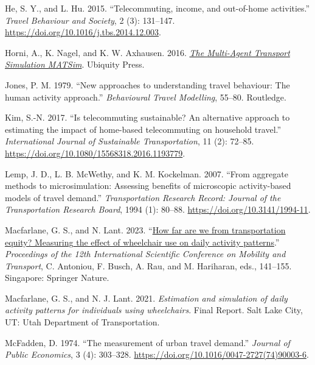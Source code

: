 \documentclass[fancy, twoside, mastersfancy, ms]{byuthesis}
\newlength{\cslhangindent}
\newenvironment{CSLReferences}[2] %
 {\begin{list}{}{%
  \setlength{\itemindent}{0pt}
  \setlength{\leftmargin}{0pt}
  \setlength{\parsep}{0pt}
  \ifodd #1
   \setlength{\leftmargin}{\cslhangindent}
   \setlength{\itemindent}{-1\cslhangindent}
  \fi
  \setlength{\itemsep}{#2\baselineskip}}}
 {\end{list}}
\begin{document}
\begin{CSLReferences}{1}{0}
He, S. Y., and L. Hu. 2015. {``Telecommuting, income, and out-of-home
activities.''} \emph{Travel Behaviour and Society}, 2 (3): 131--147.
\url{https://doi.org/10.1016/j.tbs.2014.12.003}.

Horni, A., K. Nagel, and K. W. Axhausen. 2016.
\emph{\href{https://doi.org/10.5334/baw}{The {Multi-Agent Transport
Simulation MATSim}}}. Ubiquity Press.

Jones, P. M. 1979. {``New approaches to understanding travel behaviour:
The human activity approach.''} \emph{Behavioural {Travel Modelling}},
55--80. Routledge.

Kim, S.-N. 2017. {``Is telecommuting sustainable? {An} alternative
approach to estimating the impact of home-based telecommuting on
household travel.''} \emph{International Journal of Sustainable
Transportation}, 11 (2): 72--85.
\url{https://doi.org/10.1080/15568318.2016.1193779}.

Lemp, J. D., L. B. McWethy, and K. M. Kockelman. 2007. {``From aggregate
methods to microsimulation: Assessing benefits of microscopic
activity-based models of travel demand.''} \emph{Transportation Research
Record: Journal of the Transportation Research Board}, 1994 (1): 80--88.
\url{https://doi.org/10.3141/1994-11}.

Macfarlane, G. S., and N. Lant. 2023.
{``\href{https://doi.org/10.1007/978-981-19-8361-0_10}{How far are we
from transportation equity? {Measuring} the effect of wheelchair use on
daily activity patterns}.''} \emph{Proceedings of the 12th
{International Scientific Conference} on {Mobility} and {Transport}}, C.
Antoniou, F. Busch, A. Rau, and M. Hariharan, eds., 141--155. Singapore:
Springer Nature.

Macfarlane, G. S., and N. J. Lant. 2021. \emph{Estimation and simulation
of daily activity patterns for individuals using wheelchairs}. Final
{Report}. Salt Lake City, UT: Utah Department of Transportation.

McFadden, D. 1974. {``The measurement of urban travel demand.''}
\emph{Journal of Public Economics}, 3 (4): 303--328.
\url{https://doi.org/10.1016/0047-2727(74)90003-6}.


\end{CSLReferences}
\end{document}
